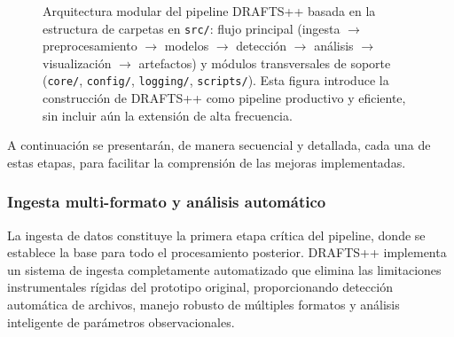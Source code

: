 \begin{figure}[H]
{}
\endgroup
\caption{Arquitectura modular del pipeline DRAFTS++ basada en la estructura de carpetas en \texttt{src/}: flujo principal (ingesta $\to$ preprocesamiento $\to$ modelos $\to$ detección $\to$ análisis $\to$ visualización $\to$ artefactos) y módulos transversales de soporte (\texttt{core/}, \texttt{config/}, \texttt{logging/}, \texttt{scripts/}). Esta figura introduce la construcción de DRAFTS++ como pipeline productivo y eficiente, sin incluir aún la extensión de alta frecuencia.}
\label{fig:workflow-src}
\end{figure}

A continuación se presentarán, de manera secuencial y detallada, cada una de estas etapas, para facilitar la comprensión de las mejoras implementadas.

\subsubsection{Ingesta multi-formato y análisis automático}

La ingesta de datos constituye la primera etapa crítica del pipeline, donde se establece la base para todo el procesamiento posterior. DRAFTS++ implementa un sistema de ingesta completamente automatizado que elimina las limitaciones instrumentales rígidas del prototipo original, proporcionando detección automática de archivos, manejo robusto de múltiples formatos y análisis inteligente de parámetros observacionales.

